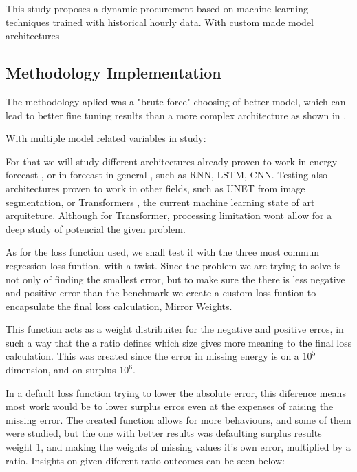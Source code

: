 

This study proposes a dynamic procurement based on machine learning techniques trained with historical hourly data. With custom made model architectures



\subsection{Methodology Implementation}

The methodology aplied was a "brute force" choosing of better model, which can lead to better fine tuning results than a more complex architecture as shown in \cite{Liu2022}.\par
With multiple model related variables in study:\par



For that we will study different architectures already proven to work in energy forecast \cite{Costa2022}, or in forecast in general \cite{Hewamalage2021}, such as \gls{RNN}, \gls{LSTM}, \gls{CNN}. Testing also architectures proven to work in other fields, such as UNET \cite{Shelhamer2014} from image segmentation, or Transformers \cite{Vaswani2017}, the current machine learning state of art arquiteture. Although for Transformer, processing limitation wont allow for a deep study of potencial the given problem.\par
As for the loss function used, we shall test it with the three most commun regression loss funtion, with a twist. Since the problem we are trying to solve is not only of finding the smallest error, but to make sure the there is less negative and positive error than the benchmark we create a custom loss funtion to encapsulate the final loss calculation, \href{https://github.com/alquimodelia/alquitable/blob/main/alquitable/advanced_losses.py#L33}{Mirror Weights}. \par
This function acts as a weight distribuiter for the negative and positive erros, in such a way that the a ratio defines which size gives more meaning to the final loss calculation. This was created since the error in missing energy is on a $10^{5}$ dimension, and on surplus $10^{6}$.\par
In a default loss function trying to lower the absolute error, this diference means most work would be to lower surplus erros even at the expenses of raising the missing error. The created function allows for more behaviours, and some of them were studied, but the one with better results was defaulting surplus results weight 1, and making the weights of missing values it's own error, multiplied by a ratio. Insights on given diferent ratio outcomes can be seen below:\par


